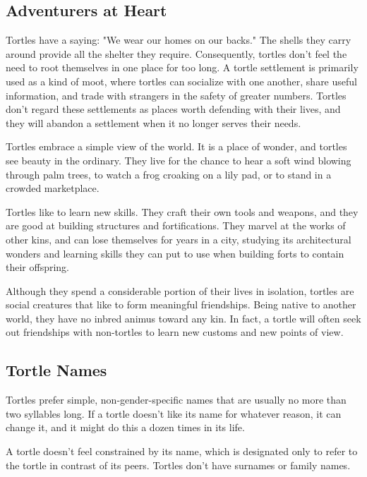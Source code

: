 \begin{linenumbers}
\subsection*{Adventurers at Heart}
Tortles have a saying: "We wear our homes on our backs."
The shells they carry around provide all the shelter they require.
Consequently, tortles don't feel the need to root themselves in one place for too long.
A tortle settlement is primarily used as a kind of moot, where tortles can socialize with one another, share useful information, and trade with strangers in the safety of greater numbers.
Tortles don't regard these settlements as places worth defending with their lives, and they will abandon a settlement when it no longer serves their needs.

Tortles embrace a simple view of the world.
It is a place of wonder, and tortles see beauty in the ordinary.
They live for the chance to hear a soft wind blowing through palm trees, to watch a frog croaking on a lily pad, or to stand in a crowded marketplace.

Tortles like to learn new skills.
They craft their own tools and weapons, and they are good at building structures and fortifications.
They marvel at the works of other kins, and can lose themselves for years in a city, studying its architectural wonders and learning skills they can put to use when building forts to contain their offspring.

Although they spend a considerable portion of their lives in isolation, tortles are social creatures that like to form meaningful friendships.
Being native to another world, they have no inbred animus toward any kin.
In fact, a tortle will often seek out friendships with non-tortles to learn new customs and new points of view.


\subsection*{Tortle Names}
Tortles prefer simple, non-gender-specific names that are usually no more than two syllables long.
If a tortle doesn't like its name for whatever reason, it can change it, and it might do this a dozen times in its life.

A tortle doesn't feel constrained by its name, which is designated only to refer to the tortle in contrast of its peers.
Tortles don't have surnames or family names.


\end{linenumbers}
